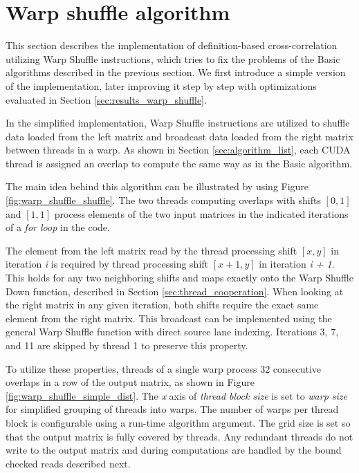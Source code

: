 \section{Warp shuffle algorithm}
\label{sec:warp_shuffle_alg}

This section describes the implementation of definition-based cross-correlation utilizing Warp Shuffle instructions, which tries to fix the problems of the Basic algorithms described in the previous section. We first introduce a simple version of the implementation, later improving it step by step with optimizations evaluated in Section \ref{sec:results_warp_shuffle}.

In the simplified implementation, Warp Shuffle instructions are utilized to shuffle data loaded from the left matrix and broadcast data loaded from the right matrix between threads in a warp. As shown in Section \ref{sec:algorithm_list}, each CUDA thread is assigned an overlap to compute the same way as in the Basic algorithm.

The main idea behind this algorithm can be illustrated by using Figure \ref{fig:warp_shuffle_shuffle}. The two threads computing overlaps with shifts $[0,1]$ and $[1,1]$ process elements of the two input matrices in the indicated iterations of a \textit{for loop} in the code.


The element from the left matrix read by the thread processing shift $[x, y]$ in iteration \textit{i} is required by thread processing shift $[x + 1,y]$ in iteration \textit{i + 1}. This holds for any two neighboring shifts and maps exactly onto the Warp Shuffle Down function, described in Section \ref{sec:thread_cooperation}. When looking at the right matrix in any given iteration, both shifts require the exact same element from the right matrix. This broadcast can be implemented using the general Warp Shuffle function with direct source lane indexing. Iterations 3, 7, and 11 are skipped by thread 1 to preserve this property.


To utilize these properties, threads of a single warp process 32 consecutive overlaps in a row of the output matrix, as shown in Figure \ref{fig:warp_shuffle_simple_dist}. The \textit{x} axis of \textit{thread block size} is set to \textit{warp size} for simplified grouping of threads into warps. The number of warps per thread block is configurable using a run-time algorithm argument. The grid size is set so that the output matrix is fully covered by threads. Any redundant threads do not write to the output matrix and during computations are handled by the bound checked reads described next.


